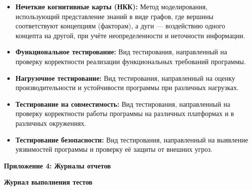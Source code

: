 \documentclass{article}
\newcommand\zz[1]{\par{\normalsize\strut #1} \hfill\ignorespaces}
\begin{document}
\begin{itemize}
    \begin{itemize}
        \item \textbf{Нечеткие когнитивные карты (НКК):} Метод моделирования, использующий представление знаний в виде графов, где вершины соответствуют концепциям (факторам), а дуги — воздействию одного концепта на другой, при учёте неопределенности и неточности информации.
        \item \textbf{Функциональное тестирование:} Вид тестирования, направленный на проверку корректности реализации функциональных требований программы.
        \item \textbf{Нагрузочное тестирование:} Вид тестирования, направленный на оценку производительности и устойчивости программы при различных нагрузках.
        \item \textbf{Тестирование на совместимость:} Вид тестирования, направленный на проверку корректности работы программы на различных платформах и в различных окружениях.
        \item \textbf{Тестирование безопасности:} Вид тестирования, направленный на выявление уязвимостей программы и проверку её защиты от внешних угроз.
    \end{itemize}

    \zz{}\textbf{Приложение 4: Журналы отчетов}

    \textbf{Журнал выполнения тестов}


\end{itemize}
\end{document}
